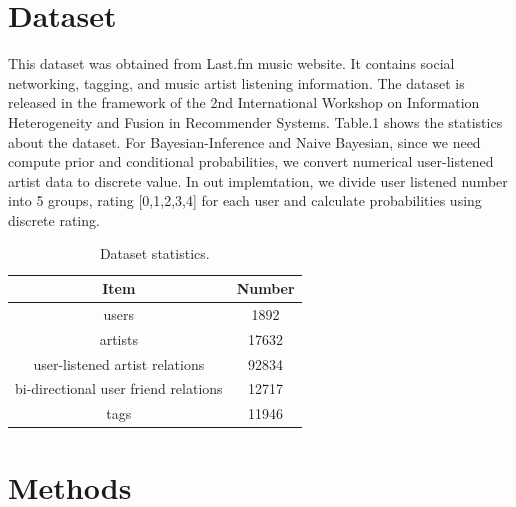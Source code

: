 \documentclass{sig-alternate}
\begin{document}
\section{Dataset}
This dataset was obtained from Last.fm \cite{lastfm} music website. It contains social networking, tagging, and music artist listening information. The dataset is released in the framework of the 2nd International Workshop on Information Heterogeneity and Fusion in Recommender Systems. Table.1 shows the statistics about the dataset.
For Bayesian-Inference and Naive Bayesian, since we need compute prior and conditional probabilities, we convert numerical user-listened artist data to discrete value.  In out implemtation, we divide user listened number into 5 groups, rating [0,1,2,3,4] for each user and calculate probabilities using discrete rating.  
\begin{table}[!t]
\centering
\caption{Dataset statistics.}
\begin{tabular}{cc}  %
\\
\hline 
Item  &  Number \\ \hline 
users    &   1892 \\ 
artists    &   17632 \\ 
user-listened artist relations    &   92834 \\ 
bi-directional user friend relations    &   12717 \\ 
tags    &   11946 \\ 
\hline 
\end{tabular}
\end{table}
\section{Methods}
\end{document}

